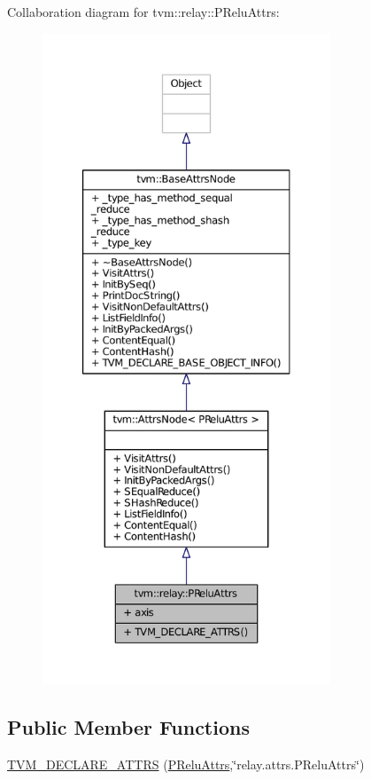 Collaboration diagram for tvm\+:\+:relay\+:\+:P\+Relu\+Attrs\+:
\nopagebreak
\begin{figure}[H]
\begin{center}
\leavevmode
\includegraphics[height=550pt]{structtvm_1_1relay_1_1PReluAttrs__coll__graph}
\end{center}
\end{figure}
\subsection*{Public Member Functions}
\begin{DoxyCompactItemize}
\item 
\hyperlink{structtvm_1_1relay_1_1PReluAttrs_aed6806c9cf8a413e628e0162e7311b7d}{T\+V\+M\+\_\+\+D\+E\+C\+L\+A\+R\+E\+\_\+\+A\+T\+T\+RS} (\hyperlink{structtvm_1_1relay_1_1PReluAttrs}{P\+Relu\+Attrs},\char`\"{}relay.\+attrs.\+P\+Relu\+Attrs\char`\"{})
\end{DoxyCompactItemize}
